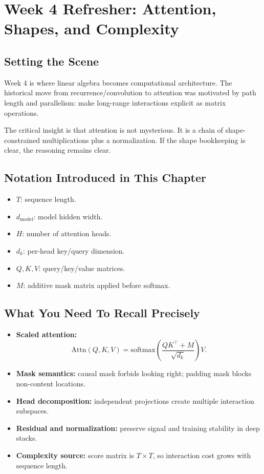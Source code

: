 \section{Week 4 Refresher: Attention, Shapes, and Complexity}

\subsection*{Setting the Scene}
Week 4 is where linear algebra becomes computational architecture. The historical move from recurrence/convolution to attention was motivated by path length and parallelism: make long-range interactions explicit as matrix operations.

The critical insight is that attention is not mysterious. It is a chain of shape-constrained multiplications plus a normalization. If the shape bookkeeping is clear, the reasoning remains clear.

\subsection*{Notation Introduced in This Chapter}
\begin{itemize}[leftmargin=1.5em]
  \item $T$: sequence length.
  \item $d_{\text{model}}$: model hidden width.
  \item $H$: number of attention heads.
  \item $d_k$: per-head key/query dimension.
  \item $Q,K,V$: query/key/value matrices.
  \item $M$: additive mask matrix applied before softmax.
\end{itemize}

\subsection*{What You Need To Recall Precisely}
\begin{itemize}[leftmargin=1.5em]
  \item \textbf{Scaled attention:}
  \[
    \mathrm{Attn}(Q,K,V)=\mathrm{softmax}\!\left(\frac{QK^\top+M}{\sqrt{d_k}}\right)V.
  \]
  \item \textbf{Mask semantics:} causal mask forbids looking right; padding mask blocks non-content locations.
  \item \textbf{Head decomposition:} independent projections create multiple interaction subspaces.
  \item \textbf{Residual and normalization:} preserve signal and training stability in deep stacks.
  \item \textbf{Complexity source:} score matrix is $T\times T$, so interaction cost grows with sequence length.
\end{itemize}

